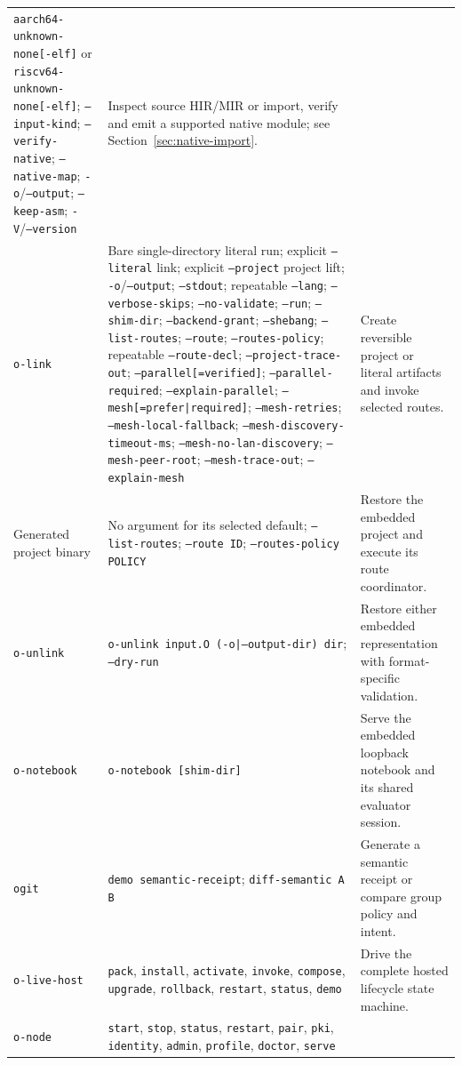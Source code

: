 \documentclass[11pt,oneside]{article}
\begin{document}
\begin{longtable}{P{0.18\textwidth} P{0.42\textwidth} P{0.32\textwidth}}
\texttt{aarch64-unknown-none[-elf]} or
\texttt{riscv64-unknown-none[-elf]}; \texttt{--input-kind};
\texttt{--verify-native}; \texttt{--native-map};
\texttt{-o}/\texttt{--output};
\texttt{--keep-asm}; \texttt{-V}/\texttt{--version} &
Inspect source HIR/MIR or import, verify and emit a supported native module; see Section~\ref{sec:native-import}. \\
\texttt{o-link} & Bare single-directory literal run; explicit
\texttt{--literal} link; explicit \texttt{--project} project lift;
\texttt{-o}/\texttt{--output};
\texttt{--stdout}; repeatable \texttt{--lang}; \texttt{--verbose-skips};
\texttt{--no-validate}; \texttt{--run}; \texttt{--shim-dir};
\texttt{--backend-grant}; \texttt{--shebang};
\texttt{--list-routes}; \texttt{--route}; \texttt{--routes-policy};
repeatable \texttt{--route-decl}; \texttt{--project-trace-out};
\texttt{--parallel[=verified]}; \texttt{--parallel-required};
\texttt{--explain-parallel}; \texttt{--mesh[=prefer|required]};
\texttt{--mesh-retries}; \texttt{--mesh-local-fallback};
\texttt{--mesh-discovery-timeout-ms}; \texttt{--mesh-no-lan-discovery};
\texttt{--mesh-peer-root}; \texttt{--mesh-trace-out};
\texttt{--explain-mesh} &
Create reversible project or literal artifacts and invoke selected routes. \\
Generated project binary & No argument for its selected default;
\texttt{--list-routes}; \texttt{--route ID}; \texttt{--routes-policy POLICY} &
Restore the embedded project and execute its route coordinator. \\
\texttt{o-unlink} & \texttt{o-unlink input.O
(-o|--output-dir) dir}; \texttt{--dry-run} &
Restore either embedded representation with format-specific validation. \\
\texttt{o-notebook} & \texttt{o-notebook [shim-dir]} &
Serve the embedded loopback notebook and its shared evaluator session. \\
\texttt{ogit} & \texttt{demo semantic-receipt}; \texttt{diff-semantic A B} &
Generate a semantic receipt or compare group policy and intent. \\
\texttt{o-live-host} & \texttt{pack}, \texttt{install}, \texttt{activate},
\texttt{invoke}, \texttt{compose}, \texttt{upgrade}, \texttt{rollback},
\texttt{restart}, \texttt{status}, \texttt{demo} &
Drive the complete hosted lifecycle state machine. \\
\texttt{o-node} & \texttt{start}, \texttt{stop}, \texttt{status},
\texttt{restart}, \texttt{pair}, \texttt{pki}, \texttt{identity},
\texttt{admin}, \texttt{profile}, \texttt{doctor}, \texttt{serve} &

\end{longtable}
\end{document}

